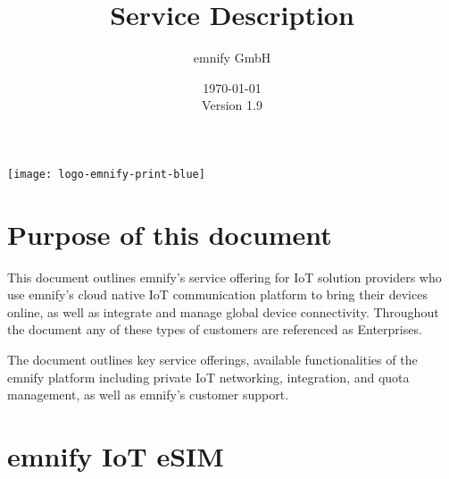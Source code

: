 \documentclass[11pt, oneside]{article}   	%
\newcommand{\addspace}{\vspace{2mm}}
\begin{document}
\title{Service Description}
\author{emnify GmbH}
\date{\today \\ \addspace Version 1.9}
\maketitle

\begin{center}
  \texttt{[image: logo-emnify-print-blue]}
\end{center}

\pagebreak[4]

\tableofcontents

\pagebreak[4]

\section{Purpose of this document}

\begin{markdown}

This document outlines emnify's service offering for IoT solution providers who use emnify's cloud native IoT communication platform to bring their devices online, as well as integrate and manage global device connectivity.
Throughout the document any of these types of customers are referenced as Enterprises. 

The document outlines key service offerings, available functionalities of the emnify platform including private IoT networking, integration, and quota management, as well as emnify's customer support.  

\end{markdown}

\section{emnify IoT eSIM}
\end{document}
